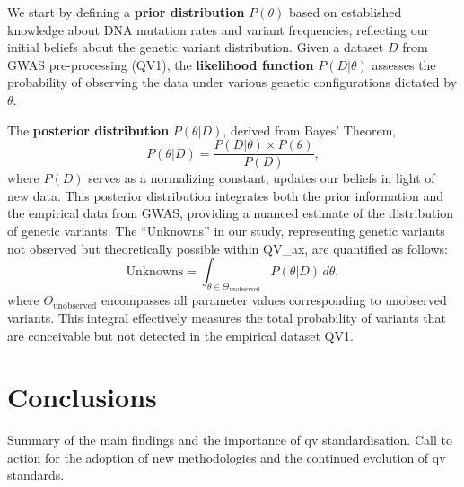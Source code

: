We start by defining a \textbf{prior distribution} \( P(\theta) \) based on established knowledge about DNA mutation rates and variant frequencies, reflecting our initial beliefs about the genetic variant distribution. Given a dataset \( D \) from GWAS pre-processing (QV1), the \textbf{likelihood function} \( P(D|\theta) \) assesses the probability of observing the data under various genetic configurations dictated by \( \theta \).

The \textbf{posterior distribution} \( P(\theta|D) \), derived from Bayes' Theorem,
\[
P(\theta|D) = \frac{P(D|\theta) \times P(\theta)}{P(D)},
\]
where \( P(D) \) serves as a normalizing constant, updates our beliefs in light of new data. This posterior distribution integrates both the prior information and the empirical data from GWAS, providing a nuanced estimate of the distribution of genetic variants.
The ``Unknowns'' in our study, representing genetic variants not observed but theoretically possible within QV\_ax, are quantified as follows:
\[
\text{Unknowns} = \int_{\theta \in \Theta_{\text{unobserved}}} P(\theta|D) \, d\theta,
\]
where \( \Theta_{\text{unobserved}} \) encompasses all parameter values corresponding to unobserved variants. This integral effectively measures the total probability of variants that are conceivable but not detected in the empirical dataset QV1.



\section{Conclusions}
Summary of the main findings and the importance of \ac{qv} standardisation. Call to action for the adoption of new methodologies and the continued evolution of \ac{qv} standards.




